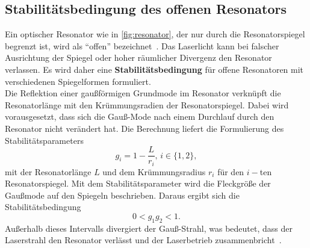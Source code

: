     \subsection{Stabilitätsbedingung des offenen Resonators}
    \label{subsec:stabilitaet}
    Ein optischer Resonator wie in \autoref{fig:resonator}, der nur durch die Resonatorspiegel begrenzt ist, wird als \enquote{offen} bezeichnet~\cite[165]{demtroeder_2011}.
    Das Laserlicht kann bei falscher Ausrichtung der Spiegel oder hoher räumlicher Divergenz den Resonator verlassen.
    Es wird daher eine \textbf{Stabilitätsbedingung} für offene Resonatoren mit verschiedenen Spiegelformen formuliert.\\
    Die Reflektion einer gaußförmigen Grundmode im Resonator verknüpft die Resonatorlänge mit den Krümmungsradien der Resonatorspiegel.
    Dabei wird vorausgesetzt, dass sich die Gauß-Mode nach einem Durchlauf durch den Resonator nicht verändert hat.
    Die Berechnung liefert die Formulierung des Stabilitätsparameters
    \begin{equation}
        g_i = 1- \frac{L}{r_i},\, i\in \{1,2\},
        \label{eqn:g}
    \end{equation}
    mit der Resonatorlänge $L$ und dem Krümmungsradius $r_i$ für den $i-$ten Resonatorspiegel.
    Mit dem Stabilitätsparameter wird die Fleckgröße der Gaußmode auf den Spiegeln beschrieben. 
    Daraus ergibt sich die Stabilitätsbedingung
    \begin{equation}
        0 < g_1 g_2 < 1. 
        \label{eqn:stabbed}
    \end{equation}
    Außerhalb dieses Intervalls divergiert der Gauß-Strahl, was bedeutet, dass der Laserstrahl den Resonator verlässt und der Laserbetrieb zusammenbricht~\cite[174]{demtroeder_2011}.
% 
% 
% 
